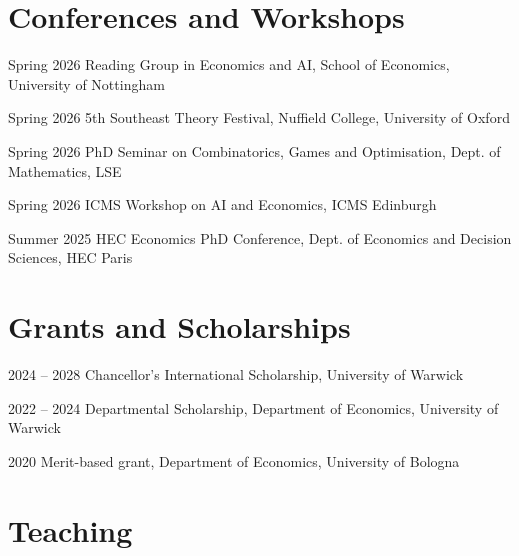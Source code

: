 \documentclass[11pt,a4paper]{article}
\begin{document}


\section{Conferences and Workshops}

\begin{cvenumerate}
	\item[Spring 2026] Reading Group in Economics and AI, School of Economics, University of Nottingham
	\item[Spring 2026] 5th Southeast Theory Festival, Nuffield College, University of Oxford
	\item[Spring 2026] PhD Seminar on Combinatorics, Games and Optimisation, Dept. of Mathematics, LSE
	\item[Spring 2026] ICMS Workshop on AI and Economics, ICMS Edinburgh
	\item[Summer 2025] HEC Economics PhD Conference, Dept. of Economics and Decision Sciences, HEC Paris
\end{cvenumerate}

\section{Grants and Scholarships}

\begin{cvenumerate}
    \item[2024  --  2028] Chancellor's International Scholarship, University of Warwick
    \item[2022  --  2024] Departmental Scholarship, Department of Economics, University of Warwick
    \item[2020] Merit-based grant, Department of Economics, University of Bologna
\end{cvenumerate}

\section{Teaching}
\end{document}

